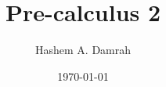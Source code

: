 \documentclass{report}
\title{Pre-calculus 2}
\author{Hashem A. Damrah}
\date{\today}
\begin{document}
  
  \mbox{}\newpage
  
  \newpage
  
\end{document}
